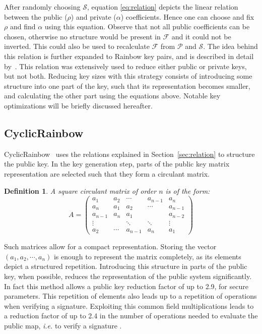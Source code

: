 \documentclass{ufsctex/ufsctex}
\newtheorem{definition}{Definition}
\begin{document}
After randomly choosing $\mathcal{S}$, equation \ref{eq:relation} depicts the
linear relation between the public ($\rho$) and private ($\alpha$)
coefficients. Hence one can choose and fix $\rho$ and find $\alpha$ using this
equation. Observe that not all public coefficients can be chosen, otherwise no
structure would be present in $\mathcal{F}$ and it could not be inverted. This
could also be used to recalculate $\mathcal{F}$ from $\mathcal{P}$ and
$\mathcal{S}$. The idea behind this relation is further expanded to Rainbow key
pairs, and is described in detail by~\cite{petzoldt2011small}. This relation
was extensively used to reduce either public or private keys, but not both.
Reducing key sizes with this strategy consists of introducing some structure
into one part of the key, such that its representation becomes smaller, and
calculating the other part using the equations above. Notable key optimizations
will be briefly discussed hereafter.

\subsection{CyclicRainbow}

CyclicRainbow~\cite{petzoldt2010cyclicrainbow} uses the relations explained in
Section~\ref{sec:relation} to structure the public key. In the key generation
step, parts of the public key matrix representation are selected such that they
form a circulant matrix.

\begin{definition}
A square circulant matrix of order $n$ is of the form:
\begin{equation}
A =
\begin{pmatrix}
a_1     & a_2    & \cdots  & a_{n-1} & a_n     \\
a_n     & a_1    & a_2     & \cdots  & a_{n-1} \\
a_{n-1} & a_n    & a_1     &         & a_{n-2} \\
\vdots  &        & \ddots  & \ddots  & \vdots  \\
a_2     & \cdots & a_{n-1} & a_n     & a_1
\end{pmatrix}
\end{equation}
\end{definition}

Such matrices allow for a compact representation. Storing the vector $(a_1,
a_2, \cdots, a_n)$ is enough to represent the matrix completely, as its
elements depict a structured repetition. Introducing this structure in parts of
the public key, when possible, reduces the representation of the public system
significantly. In fact this method allows a public key reduction factor of up
to 2.9, for secure parameters. This repetition of elements also leads up to a
repetition of operations when verifying a signature. Exploiting this common
field multiplications leads to a reduction factor of up to 2.4 in the number of
operations needed to evaluate the public map, \textit{i.e.} to verify a
signature \cite{petzoldt2013thesis}.
\end{document}
